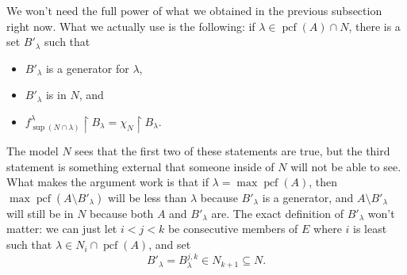 \documentclass[10pt]{amsart}
\theoremstyle{plain}
\theoremstyle{definition}
\theoremstyle{remark}
\DeclareMathOperator{\pcf}{pcf}
\numberwithin{equation}{section}
\begin{document}
We won't need the full power of what we obtained in the previous subsection right now. What
we actually use is the following:   if $\lambda\in\pcf(A)\cap N$, there
is a set $B'_\lambda$ such that
\begin{itemize}
\item $B'_\lambda$ is a generator for $\lambda$,

\item $B'_\lambda$ is in $N$, and

\item $f^\lambda_{\sup(N\cap\lambda)}\restriction B_\lambda = \chi_N\restriction B_\lambda$.
\end{itemize}
The model $N$ sees that the first two of these statements are true, but the third statement is something external that someone inside
of $N$ will not be able to see.   What makes the argument work is that if $\lambda=\max\pcf(A)$, then $\max\pcf(A\setminus B'_\lambda)$
will be less than $\lambda$ because $B'_\lambda$ is a generator, and $A\setminus B'_\lambda$ will still be in $N$ because both
$A$ and $B'_\lambda$ are.   The exact definition of $B'_\lambda$ won't matter: we can just let $i<j<k$ be consecutive members of $E$
where $i$ is least such that $\lambda\in N_i\cap\pcf(A)$, and set
\begin{equation}
B'_\lambda = B^{j, k}_\lambda \in N_{k+1}\subseteq N.
\end{equation}
\end{document}
